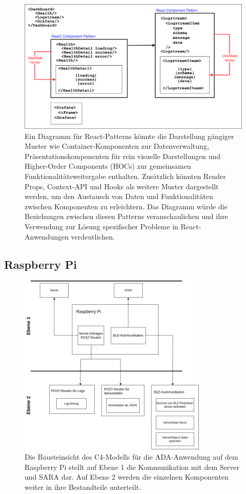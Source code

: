 \documentclass[
]{article}
\begin{document}
\begin{figure}[H]
	\centering
	\includegraphics[width=140mm]{resources/reactpatternfe.drawio.png}
	\caption{Ein Diagramm für React-Patterns könnte die Darstellung gängiger Muster wie Container-Komponenten zur Datenverwaltung, Präsentationskomponenten für rein visuelle Darstellungen und Higher-Order Components (HOCs) zur gemeinsamen Funktionalitätsweitergabe enthalten. Zusätzlich könnten Render Props, Context-API und Hooks als weitere Muster dargestellt werden, um den Austausch von Daten und Funktionalitäten zwischen Komponenten zu erleichtern. Das Diagramm würde die Beziehungen zwischen diesen Patterns veranschaulichen und ihre Verwendung zur Lösung spezifischer Probleme in React-Anwendungen verdeutlichen.}
	\label{fig:ReactPattern}
\end{figure}

\subsection{Raspberry Pi}
\begin{figure}[H]
	\centering
	\includegraphics[width=90mm]{resources/ADABausteinsicht.png}
	\caption{Die Bausteinsicht des C4-Modells für die ADA-Anwendung auf dem Raspberry Pi stellt auf Ebene 1 die Kommunikation mit dem Server und SARA dar. Auf Ebene 2 werden die einzelnen Komponenten weiter in ihre Bestandteile unterteilt.}
	\label{fig:BausteinRaspberry}
\end{figure}  
\end{document}

